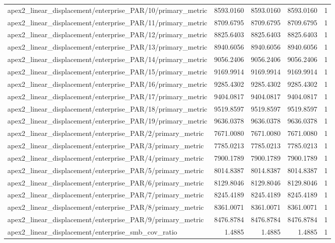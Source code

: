 \begin{table}[h]
\begin{tabular}{lrrrr}
apex2_linear_displacement/enterprise_PAR/10/primary_metric & 8593.0160 & 8593.0160 & 8593.0160 & 1 \\
apex2_linear_displacement/enterprise_PAR/11/primary_metric & 8709.6795 & 8709.6795 & 8709.6795 & 1 \\
apex2_linear_displacement/enterprise_PAR/12/primary_metric & 8825.6403 & 8825.6403 & 8825.6403 & 1 \\
apex2_linear_displacement/enterprise_PAR/13/primary_metric & 8940.6056 & 8940.6056 & 8940.6056 & 1 \\
apex2_linear_displacement/enterprise_PAR/14/primary_metric & 9056.2406 & 9056.2406 & 9056.2406 & 1 \\
apex2_linear_displacement/enterprise_PAR/15/primary_metric & 9169.9914 & 9169.9914 & 9169.9914 & 1 \\
apex2_linear_displacement/enterprise_PAR/16/primary_metric & 9285.4302 & 9285.4302 & 9285.4302 & 1 \\
apex2_linear_displacement/enterprise_PAR/17/primary_metric & 9404.0817 & 9404.0817 & 9404.0817 & 1 \\
apex2_linear_displacement/enterprise_PAR/18/primary_metric & 9519.8597 & 9519.8597 & 9519.8597 & 1 \\
apex2_linear_displacement/enterprise_PAR/19/primary_metric & 9636.0378 & 9636.0378 & 9636.0378 & 1 \\
apex2_linear_displacement/enterprise_PAR/2/primary_metric & 7671.0080 & 7671.0080 & 7671.0080 & 1 \\
apex2_linear_displacement/enterprise_PAR/3/primary_metric & 7785.0213 & 7785.0213 & 7785.0213 & 1 \\
apex2_linear_displacement/enterprise_PAR/4/primary_metric & 7900.1789 & 7900.1789 & 7900.1789 & 1 \\
apex2_linear_displacement/enterprise_PAR/5/primary_metric & 8014.8387 & 8014.8387 & 8014.8387 & 1 \\
apex2_linear_displacement/enterprise_PAR/6/primary_metric & 8129.8046 & 8129.8046 & 8129.8046 & 1 \\
apex2_linear_displacement/enterprise_PAR/7/primary_metric & 8245.4189 & 8245.4189 & 8245.4189 & 1 \\
apex2_linear_displacement/enterprise_PAR/8/primary_metric & 8361.0071 & 8361.0071 & 8361.0071 & 1 \\
apex2_linear_displacement/enterprise_PAR/9/primary_metric & 8476.8784 & 8476.8784 & 8476.8784 & 1 \\
apex2_linear_displacement/enterprise_smb_cov_ratio & 1.4885 & 1.4885 & 1.4885 & 1 \\

\end{tabular}
\end{table}
